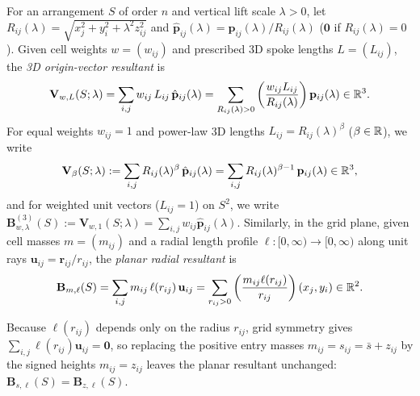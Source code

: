 \begin{definition}
\label{def:radial-resultant}
For an arrangement $S$ of order $n$ and vertical lift scale $\lambda>0$, let $R_{ij}(\lambda)=\sqrt{x_j^2+y_i^2+\lambda^2z_{ij}^2}$ and $\hat{\mathbf p}_{ij}(\lambda)=\mathbf p_{ij}(\lambda)/R_{ij}(\lambda)$ ($\mathbf 0$ if $R_{ij}(\lambda)=0$). Given cell weights $w=(w_{ij})$ and prescribed 3D spoke lengths $L=(L_{ij})$, the \emph{3D origin-vector resultant} is
\begin{equation}
\label{eq:V-3d-general}
\mathbf V_{w,L}(S;\lambda) = \sum_{i,j} w_{ij}\,L_{ij}\,\hat{\mathbf p}_{ij}(\lambda)
= \sum_{R_{ij}(\lambda)>0} \left(\frac{w_{ij}L_{ij}}{R_{ij}(\lambda)}\right)\mathbf p_{ij}(\lambda) \in \mathbb{R}^3.
\end{equation}
For equal weights $w_{ij}=1$ and power-law 3D lengths $L_{ij}=R_{ij}(\lambda)^\beta$ ($\beta\in\mathbb{R}$), we write
\begin{equation}
\label{eq:V-beta}
\mathbf V_\beta(S;\lambda) := \sum_{i,j} R_{ij}(\lambda)^\beta\,\hat{\mathbf p}_{ij}(\lambda)
= \sum_{i,j} R_{ij}(\lambda)^{\beta-1}\,\mathbf p_{ij}(\lambda) \in \mathbb{R}^3,
\end{equation}
and for weighted unit vectors ($L_{ij}=1$) on $S^2$, we write $\mathbf B^{(3)}_{w,\lambda}(S):=\mathbf V_{w,1}(S;\lambda)=\sum_{i,j}w_{ij}\hat{\mathbf p}_{ij}(\lambda)$. Similarly, in the grid plane, given cell masses $m=(m_{ij})$ and a radial length profile $\ell\colon[0,\infty)\to[0,\infty)$ along unit rays $\mathbf u_{ij}=\mathbf r_{ij}/r_{ij}$, the \emph{planar radial resultant} is
\begin{equation}
\label{eq:B-planar}
\mathbf B_{m,\ell}(S) = \sum_{i,j} m_{ij}\,\ell(r_{ij})\,\mathbf u_{ij}
= \sum_{r_{ij}>0} \left(\frac{m_{ij}\ell(r_{ij})}{r_{ij}}\right)(x_j,y_i) \in \mathbb{R}^2.
\end{equation}
\end{definition}

Because $\ell(r_{ij})$ depends only on the radius $r_{ij}$, grid symmetry gives $\sum_{i,j}\ell(r_{ij})\mathbf u_{ij}=\mathbf 0$, so replacing the positive entry masses $m_{ij}=s_{ij}=\bar s+z_{ij}$ by the signed heights $m_{ij}=z_{ij}$ leaves the planar resultant unchanged: $\mathbf B_{s,\ell}(S)=\mathbf B_{z,\ell}(S)$.

